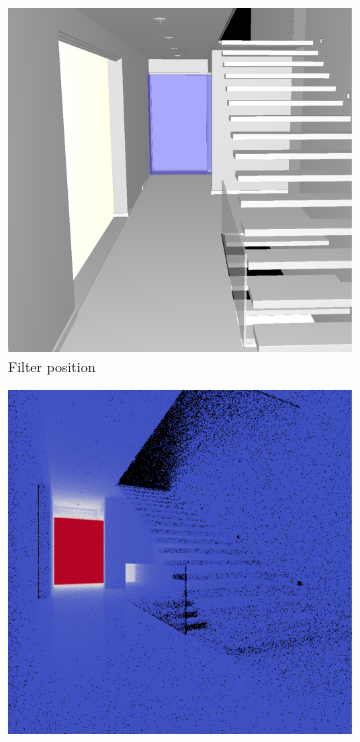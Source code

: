 \begin{figure}
	\centering
	\begin{subfigure}[t]{0.32\linewidth}
		\includegraphics[width=\textwidth]{chapters/chapter_results/ds2filterpos1}
		\caption{Filter position}
	\end{subfigure}
	\begin{subfigure}[t]{0.32\linewidth}
		\includegraphics[width=\textwidth]{chapters/chapter_results/correct2ppp}

\end{subfigure}
\end{figure}
